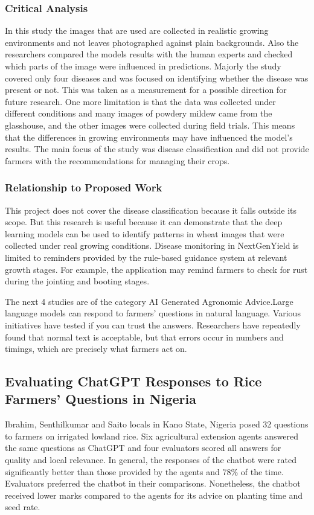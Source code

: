 \documentclass{FastFyp}
\begin{document}
\subsubsection{Critical Analysis}
In this study the images that are used are collected in realistic growing environments and not leaves photographed against plain backgrounds. Also the researchers compared the models results with the human experts and checked which parts of the image were influenced in predictions. Majorly the study covered only four diseases and was focused on identifying whether the disease was present or not. This was taken as a measurement for a possible direction for future research. One more limitation is that the data was collected under different conditions and many images of powdery mildew came from the glasshouse, and the other images were collected during field trials. This means that the differences in growing environments may have influenced the model's results. The main focus of the study was disease classification and did not provide farmers with the recommendations for managing their crops.

\subsubsection{Relationship to Proposed Work}
This project does not cover the disease classification because it falls outside its scope. But this research is useful because it can demonstrate that the deep learning models can be used to identify patterns in wheat images that were collected under real growing conditions. Disease monitoring in NextGenYield is limited to reminders provided by the rule-based guidance system at relevant growth stages. For example, the application may remind farmers to check for rust during the jointing and booting stages.

The next 4 studies are of the category AI Generated Agronomic Advice.Large language models can respond to farmers’ questions in natural language. Various initiatives have tested if you can trust the answers. Researchers have repeatedly found that normal text is acceptable, but that errors occur in numbers and timings, which are precisely what farmers act on.

\subsection{Evaluating ChatGPT Responses to Rice Farmers' Questions in Nigeria}

Ibrahim, Senthilkumar and Saito \cite{ref:Ibrahim:2024} locals in Kano State, Nigeria posed 32 questions to farmers on irrigated lowland rice. Six agricultural extension agents answered the same questions as ChatGPT and four evaluators scored all answers for quality and local relevance. In general, the responses of the chatbot were rated significantly better than those provided by the agents and 78\% of the time. Evaluators preferred the chatbot in their comparisons. Nonetheless, the chatbot received lower marks compared to the agents for its advice on planting time and seed rate.
\end{document}
